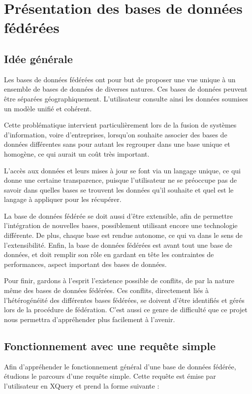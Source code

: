 \section{Présentation des bases de données fédérées}

\subsection{Idée générale}

Les bases de données fédérées ont pour but de proposer une vue unique à un ensemble de bases de données de diverses natures. Ces bases de données peuvent être séparées géographiquement. L’utilisateur consulte ainsi les données soumises un modèle unifié et cohérent.

Cette problématique intervient particulièrement lors de la fusion de systèmes d’information, voire d’entreprises, lorsqu’on souhaite associer des bases de données différentes sans pour autant les regrouper dans une base unique et homogène, ce qui aurait un coût très important.

L’accès aux données et leurs mises à jour se font via un langage unique, ce qui donne une certaine transparence, puisque l’utilisateur ne se préoccupe pas de savoir dans quelles bases se trouvent les données qu’il souhaite et quel est le langage à appliquer pour les récupérer.

La base de données fédérée se doit aussi d’être extensible, afin de permettre l’intégration de nouvelles bases, possiblement utilisant encore une technologie différente. De plus, chaque base est rendue autonome, ce qui va dans le sens de l’extensibilité. Enfin, la base de données fédérées est avant tout une base de données, et doit remplir son rôle en gardant en tête les contraintes de performances, aspect important des bases de données.

Pour finir, gardons à l’esprit l’existence possible de conflits, de par la nature même des bases de données fédérées. Ces conflits, directement liés à l’hétérogénéité des différentes bases fédérées, se doivent d’être identifiés et gérés lors de la procédure de fédération. C’est aussi ce genre de difficulté que ce projet nous permettra d’appréhender plus facilement à l’avenir.


\subsection{Fonctionnement avec une requête simple}

Afin d’appréhender le fonctionnement général d’une base de données fédérée, étudions le parcours d’une requête simple. Cette requête est émise par l’utilisateur en XQuery et prend la forme suivante :

